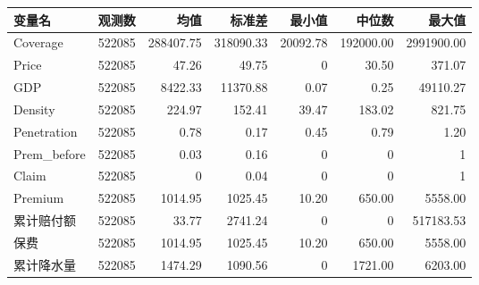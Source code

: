 \begin{tabular}{lrrrrrr}
\toprule
变量名 & 观测数 & 均值 & 标准差 & 最小值 & 中位数 & 最大值 \\
\midrule
Coverage & 522085 & 288407.75 & 318090.33 & 20092.78 & 192000.00 & 2991900.00 \\
Price & 522085 & 47.26 & 49.75 & 0 & 30.50 & 371.07 \\
GDP & 522085 & 8422.33 & 11370.88 & 0.07 & 0.25 & 49110.27 \\
Density & 522085 & 224.97 & 152.41 & 39.47 & 183.02 & 821.75 \\
Penetration & 522085 & 0.78 & 0.17 & 0.45 & 0.79 & 1.20 \\
Prem\_before & 522085 & 0.03 & 0.16 & 0 & 0 & 1 \\
Claim & 522085 & 0 & 0.04 & 0 & 0 & 1 \\
Premium & 522085 & 1014.95 & 1025.45 & 10.20 & 650.00 & 5558.00 \\
累计赔付额 & 522085 & 33.77 & 2741.24 & 0 & 0 & 517183.53 \\
保费 & 522085 & 1014.95 & 1025.45 & 10.20 & 650.00 & 5558.00 \\
累计降水量 & 522085 & 1474.29 & 1090.56 & 0 & 1721.00 & 6203.00 \\
\bottomrule
\end{tabular}
